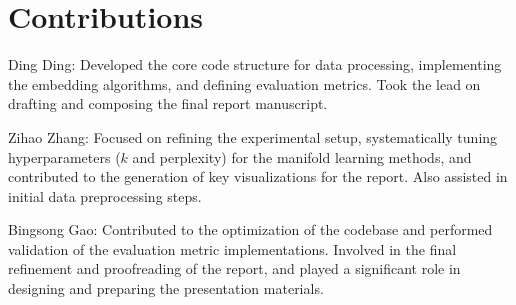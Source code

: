 \documentclass{article}
\begin{document}
\section*{Contributions}

Ding Ding: Developed the core code structure for data processing, implementing the embedding algorithms, and defining evaluation metrics. Took the lead on drafting and composing the final report manuscript.

Zihao Zhang: Focused on refining the experimental setup, systematically tuning hyperparameters ($k$ and perplexity) for the manifold learning methods, and contributed to the generation of key visualizations for the report. Also assisted in initial data preprocessing steps.

Bingsong Gao: Contributed to the optimization of the codebase and performed validation of the evaluation metric implementations. Involved in the final refinement and proofreading of the report, and played a significant role in designing and preparing the presentation materials.

\FloatBarrier %
\nocite{*}
\end{document}
